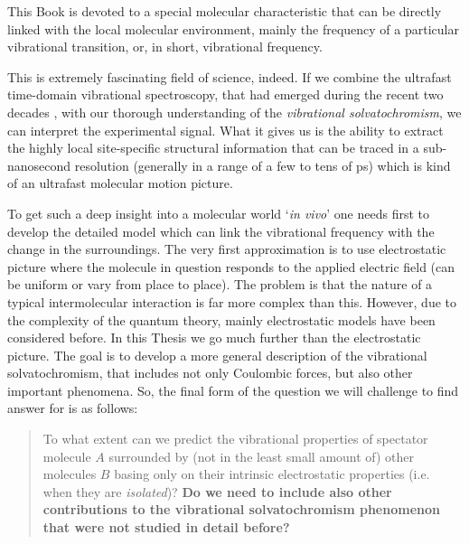 \documentclass[b5paper,oneside,fleqn,11pt]{book}
\begin{document}
\begin{refsection}
This Book is devoted to a special molecular characteristic 
that can be directly linked with the local molecular environment, mainly
the frequency of a particular vibrational transition, or, in short, 
vibrational frequency. 

This is extremely fascinating field of science, indeed. If we combine the
ultrafast time\hyp{}domain vibrational spectroscopy, that had emerged during the recent
two decades \citep{Book-Cho.TwoDimensionalOpticalSpectroscopy.2009}, 
with our thorough understanding of the \emph{vibrational solvatochromism},
we can interpret the experimental signal. What it gives us is the 
ability to extract the highly local site\hyp{}specific structural information
that can be traced in a sub-nanosecond resolution (generally in a range of
a few to tens of ps) which is kind of an ultrafast molecular motion picture.

To get such a deep insight into a molecular world `\emph{in vivo}' one needs
first to develop the detailed model which can link the vibrational frequency
with the change in the surroundings. The very first approximation is to use
electrostatic picture where the molecule in question responds to the applied
electric field (can be uniform or vary from place to place). The problem is that
the nature of a typical intermolecular interaction is far more complex than this. However, 
due to the complexity of the quantum theory, mainly electrostatic models
have been considered before. In this Thesis we go much further than the
electrostatic picture. The goal is to develop 
a more general description of the vibrational solvatochromism, that includes
not only Coulombic forces, but also other important phenomena. 
So, the final form of the 
question we will challenge to find answer for is as follows:
%
\begin{quote}
To what extent can we predict the vibrational properties of spectator molecule $A$ 
surrounded by (not in the least small amount of) other molecules $B$
basing only on their intrinsic electrostatic properties 
(i.e. when they are \emph{isolated})? \textbf{Do we need to include also other
contributions to the vibrational solvatochromism phenomenon that were not studied
in detail before?}
\end{quote}
%


\end{refsection}
\end{document}
